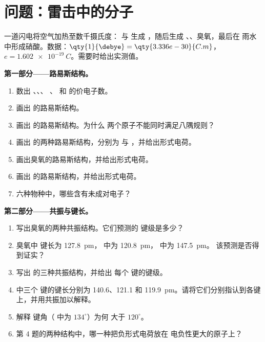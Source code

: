 \section{问题：雷击中的分子}

\begin{problem}
\label{pb:b1:lewis-resonance-vsepr:1}
一道闪电将空气加热至数千摄氏度： 与 
生成 ，随后生成 、、臭氧，最后在
雨水中形成硝酸。数据：$\qty{1}{\debye} = \qty{3.336e-30}{C.m}$，$e =
\qty{1.602e-19}{C}$。需要时给出实测值。

\medskip
\noindent\textbf{第一部分——路易斯结构。}
\begin{enumerate}
  \item 数出 、、、
        、 和  的价电子数。
  \item 画出  的路易斯结构。
  \item 画出  的路易斯结构。为什么
        两个原子不能同时满足八隅规则？
  \item 画出  的两种路易斯结构，分别为  与
        ，并给出形式电荷。
  \item 画出臭氧的路易斯结构，并给出形式电荷。
  \item 画出  的路易斯结构，并给出形式电荷。
  \item 六种物种中，哪些含有未成对电子？
\end{enumerate}

\medskip
\noindent\textbf{第二部分——共振与键长。}
\begin{enumerate}[resume]
  \item 写出臭氧的两种共振结构。它们预测的
        键级是多少？
  \item 臭氧中  键长为 \qty{127.8}{pm}，
         中为 \qty{120.8}{pm}， 中为 \qty{147.5}{pm}。
        该预测是否得到证实？
  \item 写出  的三种共振结构，并给出
        每个  键的键级。
  \item {} 中三个  键的键长分别为 140.6、121.1 和
        \qty{119.9}{pm}。请将它们分别指认到各键上，并用共振加以解释。
  \item 解释  键角（ 中为 $134^\circ$）为何
        大于 $120^\circ$。
  \item 第 4 题的两种结构中，哪一种把负形式电荷放在
        电负性更大的原子上？
\end{enumerate}


\end{problem}
